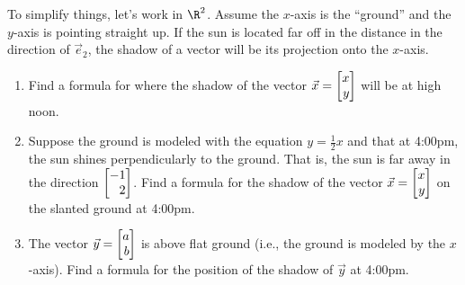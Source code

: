 \begin{enumerate}
		To simplify things, let's work in $\R^2$. Assume the $x$-axis is the ``ground'' and the $y$-axis is
		pointing straight up. If the sun is located far off in the distance in the direction of $\vec e_2$,
		the shadow of a vector will be its projection onto the $x$-axis.
		\begin{enumerate}
			\item Find a formula for where the shadow of the vector $\vec x=\mat{x\\y}$ will be at high noon.
			\item Suppose the ground is modeled with the equation $y=\tfrac{1}{2}x$ and that at 4:00pm, the sun shines
				perpendicularly to the ground. That is, the sun is far away in the direction $\mat{-1\\2}$.
				Find a formula for the shadow of the vector $\vec x=\mat{x\\y}$ on the slanted ground at 4:00pm.
			\item The vector $\vec y=\mat{a\\b}$ is above flat ground (i.e., the ground is modeled by the $x$-axis).
				Find a formula for the position of the shadow of $\vec y$ at 4:00pm.
		\end{enumerate}

\end{enumerate}